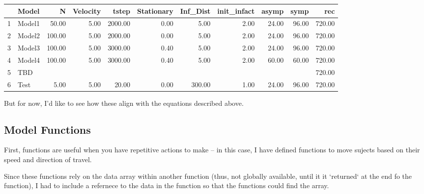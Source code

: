 \documentclass{article}\usepackage[]{graphicx}\usepackage[]{color}
\begin{document}
\begin{table}[ht]
\centering
\begin{tabular}{rlrrrrrrrrr}
  \hline
 & Model & N & Velocity & tstep & Stationary & Inf\_Dist & init\_infact & asymp & symp & rec \\ 
  \hline
1 & Model1 & 50.00 & 5.00 & 2000.00 & 0.00 & 5.00 & 2.00 & 24.00 & 96.00 & 720.00 \\ 
  2 & Model2 & 100.00 & 5.00 & 2000.00 & 0.00 & 5.00 & 2.00 & 24.00 & 96.00 & 720.00 \\ 
  3 & Model3 & 100.00 & 5.00 & 3000.00 & 0.40 & 5.00 & 2.00 & 24.00 & 96.00 & 720.00 \\ 
  4 & Model4 & 100.00 & 5.00 & 3000.00 & 0.40 & 5.00 & 2.00 & 60.00 & 60.00 & 720.00 \\ 
  5 & TBD &  &  &  &  &  &  &  &  & 720.00 \\ 
  6 & Test & 5.00 & 5.00 & 20.00 & 0.00 & 300.00 & 1.00 & 24.00 & 96.00 & 720.00 \\ 
   \hline
\end{tabular}
\end{table}


But for now, I'd like to see how these align with the equations described above.

\subsection{Model Functions}

First, functions are useful when you have repetitive actions to make -- in this case, I have defined functions to move sujects based on their speed and direction of travel. 

Since these functions rely on the data array within another function (thus, not globally available, until it it `returned` at the end fo the function), I had to include a refernece to the data in the function so that the functions could find the array.
\end{document}
